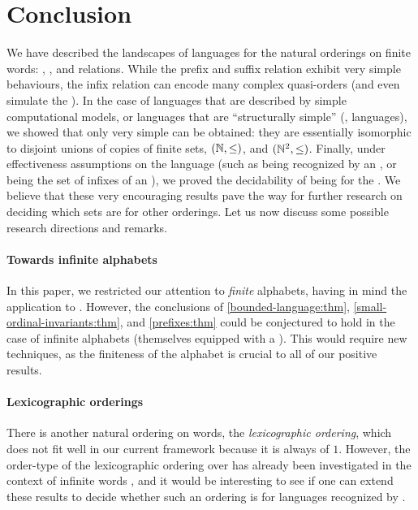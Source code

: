 \section{Conclusion}
\label{conclusion:sec}

We have described the landscapes of  languages for the
natural orderings on finite words: , , and 
relations. While the prefix and suffix relation exhibit very simple behaviours,
the infix relation can encode many complex quasi-orders (and even simulate the
). In the case of languages that are described by simple
computational models, or languages that are ``structurally simple''
(,  languages), we showed that only
very simple  can be obtained: they are essentially
isomorphic to disjoint unions of copies of finite sets, $(\mathbb{N}, \leq)$, and
$(\mathbb{N}^2, \leq)$. Finally, under effectiveness assumptions on the language
(such as being recognized by an , or being the set of
infixes of an ), we proved the decidability of being
 for the . We believe that these very
encouraging results pave the way for further research on deciding which sets
are  for other orderings. Let us now discuss
some possible research directions and remarks.

\paragraph*{Towards infinite alphabets} In this paper, we restricted our
attention to \emph{finite} alphabets, having in mind the application to
. However, the conclusions of
\cref{bounded-language:thm}, \cref{small-ordinal-invariants:thm}, and
\cref{prefixes:thm} could be conjectured to hold in the case of infinite
alphabets (themselves equipped with a ). This would
require new techniques, as the finiteness of the alphabet is crucial to all of
our positive results.

\paragraph*{Lexicographic orderings} There is another natural ordering on
words, the \emph{lexicographic ordering}, which does not fit well in our
current framework because it is always of  $1$. However, the
order-type of the lexicographic ordering over  has
already been investigated in the context of infinite words \cite{CACOPU18}, and
it would be interesting to see if one can extend these results to decide
whether such an ordering is  for languages recognized by
.

